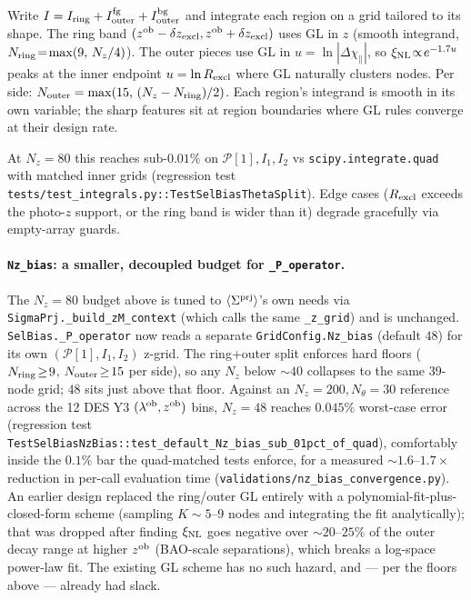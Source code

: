 \documentclass[a4paper, 11pt]{article}
\newcommand{\lob}{\lambda^{\rm ob}}
\newcommand{\zob}{z^{\rm ob}}
\newcommand{\xinl}{\xi_{\rm NL}}
\newcommand{\Pop}{\mathcal{P}}
\newcommand{\Sprj}{\Sigma^{\rm prj}}
\newcommand{\avg}[1]{\langle #1 \rangle}
\begin{document}
Write \(I = I_{\rm ring} + I_{\rm outer}^{\rm fg}
+ I_{\rm outer}^{\rm bg}\) and integrate each region on a grid
tailored to its shape. The ring band
\((\zob-\delta z_{\rm excl},\zob+\delta z_{\rm excl})\) uses GL in
\(z\) (smooth integrand, \(N_{\rm ring}\!=\!\max(9,\,N_z/4)\)). The
outer pieces use GL in \(u=\ln|\Delta\chi_\parallel|\), so
\(\xinl\!\propto\!e^{-1.7u}\) peaks at the inner endpoint
\(u=\ln R_{\rm excl}\) where GL naturally clusters nodes. Per side:
\(N_{\rm outer}=\max(15,\,(N_z-N_{\rm ring})/2)\). Each region's
integrand is smooth in its own variable; the sharp features sit at
region boundaries where GL rules converge at their design rate.

At \(N_z\!=\!80\) this reaches sub-\(0.01\%\) on \(\Pop[1],I_1,I_2\)
vs \texttt{scipy.integrate.quad} with matched inner grids (regression
test \texttt{tests/test\_integrals.py::TestSelBiasThetaSplit}).
Edge cases (\(R_{\rm excl}\) exceeds the photo-\(z\) support, or
the ring band is wider than it) degrade gracefully via empty-array
guards.

\paragraph{\texttt{Nz\_bias}: a smaller, decoupled budget for \texttt{\_P\_operator}.}
The \(N_z\!=\!80\) budget above is tuned to \(\avg{\Sprj}\)'s own
needs via \texttt{SigmaPrj.\_build\_zM\_context} (which calls the same
\texttt{\_z\_grid}) and is unchanged. \texttt{SelBias.\_P\_operator}
now reads a separate \texttt{GridConfig.Nz\_bias} (default \(48\)) for
its own \((\Pop[1],I_1,I_2)\) z-grid. The ring+outer split enforces
hard floors (\(N_{\rm ring}\!\geq\!9\), \(N_{\rm outer}\!\geq\!15\) per
side), so any \(N_z\) below \(\sim\!40\) collapses to the same
39-node grid; \(48\) sits just above that floor. Against an
\(N_z\!=\!200,N_\theta\!=\!30\) reference across the 12 DES Y3
\((\lob,\zob)\) bins, \(N_z\!=\!48\) reaches \(0.045\%\) worst-case
error (regression test
\texttt{TestSelBiasNzBias::test\_default\_Nz\_bias\_sub\_01pct\_of\_quad}),
comfortably inside the \(0.1\%\) bar the quad-matched tests enforce,
for a measured \(\sim\!1.6\)--\(1.7\times\) reduction in per-call
evaluation time (\texttt{validations/nz\_bias\_convergence.py}). An
earlier design replaced the ring/outer GL entirely with a
polynomial-fit-plus-closed-form scheme (sampling \(K\!\sim\!5\)--9
nodes and integrating the fit analytically); that was dropped after
finding \(\xinl\) goes negative over \(\sim\!20\)--\(25\%\) of the
outer decay range at higher \(\zob\) (BAO-scale separations), which
breaks a log-space power-law fit. The existing GL scheme has no such
hazard, and — per the floors above — already had slack.
\end{document}
